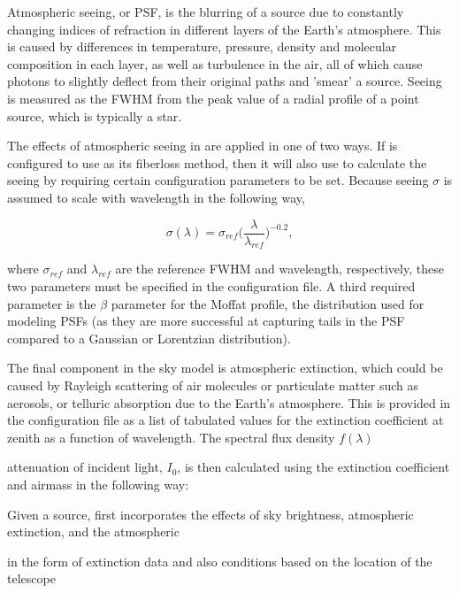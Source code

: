 Atmospheric seeing, or PSF, is the blurring of a source due to constantly changing indices of refraction in different layers of the Earth's atmosphere. This is caused by differences in temperature, pressure, density and molecular composition in each layer, as well as turbulence in the air, all of which cause photons to slightly deflect from their original paths and 'smear' a source. Seeing is measured as the FWHM from the peak value of a radial profile of a point source, which is typically a star.

The effects of atmospheric seeing in  are applied in one of two ways. If  is configured to use  as its fiberloss method, then it will also use  to calculate the seeing by requiring certain configuration parameters to be set. Because seeing $\sigma$ is assumed to scale with wavelength in the following way, 

\begin{equation}
    \sigma(\lambda) = \sigma_{ref} \Big(\frac{\lambda}{\lambda_{ref}}\Big)^{-0.2},
\end{equation}

where $\sigma_{ref}$ and $\lambda_{ref}$ are the reference FWHM and wavelength, respectively, these two parameters must be specified in the configuration file. A third required parameter is the $\beta$ parameter for the Moffat profile, the distribution used for modeling PSFs (as they are more successful at capturing tails in the PSF compared to a Gaussian or Lorentzian distribution).   

The final component in the sky model is atmospheric extinction, which could be caused by Rayleigh scattering of air molecules or particulate matter such as aerosols, or telluric absorption due to the Earth's atmosphere. This is provided in the configuration file as a list of tabulated values for the extinction coefficient at zenith as a function of wavelength. The spectral flux density $f(\lambda)$ 

attenuation of incident light, $I_{0}$, is then calculated using the extinction coefficient and airmass in the following way:



Given a source,  first incorporates the effects of sky brightness, atmospheric extinction, and the atmospheric 


in the form of extinction data and also conditions based on the location of the telescope

